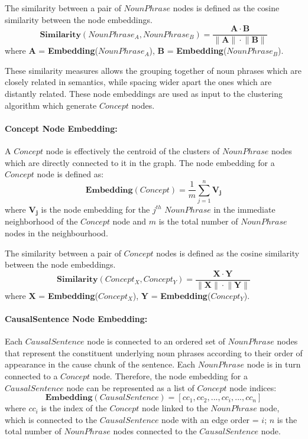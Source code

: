 The similarity between a pair of $NounPhrase$ nodes is defined as the cosine similarity between the node embeddings. 
\[ \mathbf{Similarity}(NounPhrase_A, NounPhrase_B) = \frac{\mathbf{A \cdot B} } {\mathbf{\lVert A \rVert \cdot \lVert B \rVert}} \]  where $\mathbf{A}$ = \textbf{Embedding}($NounPhrase_A$), $\mathbf{B}$ = \textbf{Embedding}($NounPhrase_B$).

These similarity measures allows the grouping together of noun phrases which are closely related in semantics, while spacing wider apart the ones which are distantly related. These node embeddings are used as input to the clustering algorithm which generate $Concept$ nodes.

\paragraph{Concept Node Embedding:} A $Concept$ node is effectively the centroid of the clusters of $NounPhrase$ nodes which are directly connected to it in the graph. The node embedding for a $Concept$ node is defined as:
\[ \mathbf{Embedding}(Concept) = \frac{1}{m} \sum_{j=1} ^n {\mathbf{V_j}}\] 
where $\mathbf{V_j}$ is the node embedding for the $j^{th}$ $NounPhrase$ in the immediate neighborhood of the $Concept$ node and $m$ is the total number of $NounPhrase$ nodes in the neighbourhood. 

The similarity between a pair of $Concept$ nodes is defined as the cosine similarity between the node embeddings. 
\[ \mathbf{Similarity}(Concept_X, Concept_Y) = \frac{\mathbf{X \cdot Y} } {\mathbf{\lVert X \rVert \cdot \lVert Y \rVert}} \]  where $\mathbf{X}$ = \textbf{Embedding}($Concept_X$), $\mathbf{Y}$ = \textbf{Embedding}($Concept_Y$).


\paragraph{CausalSentence Node Embedding:} Each $CausalSentence$ node is connected to an ordered set of $NounPhrase$ nodes that represent the constituent underlying noun phrases according to their order of appearance in the cause chunk of the sentence. Each $NounPhrase$ node is in turn connected to a $Concept$ node. Therefore, the node embedding for a $CausalSentence$ node can be represented as a list of $Concept$ node indices: 
\[ \mathbf{Embedding}(CausalSentence) = [cc_1, cc_2, ..., cc_i, ..., cc_n] \]
where $cc_i$ is the index of the $Concept$ node linked to the $NounPhrase$ node, which is connected to the $CausalSentence$ node with an edge order = $i$; $n$ is the total number of $NounPhrase$ nodes connected to the $CausalSentence$ node. 

